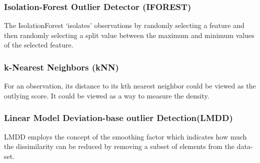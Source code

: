 \subsubsection{Isolation-Forest Outlier Detector (IFOREST)}
\label{subsubsec:introduction:related-works:iforest}
The IsolationForest ‘isolates’ observations by randomly selecting a feature and then randomly selecting a split value between the maximum and minimum values of the selected feature.
\cite{tony2012iforest}
\cite{tony2008iforest}

\subsubsection{k-Nearest Neighbors (kNN)}
\label{subsubsec:introduction:related-works:knn}
For an observation, its distance to its kth nearest neighbor could be viewed as the outlying score.
It could be viewed as a way to measure the density.
\cite{sridhar2000knn}
\cite{fabrizio2002knn}

\subsubsection{Linear Model Deviation-base outlier Detection(LMDD)}
\label{subsubsec:introduction:related-works:lmdd}
LMDD employs the concept of the smoothing factor which indicates how much the dissimilarity can be reduced by removing a subset of elements from the data-set.
\cite{arning1996lmdd}

